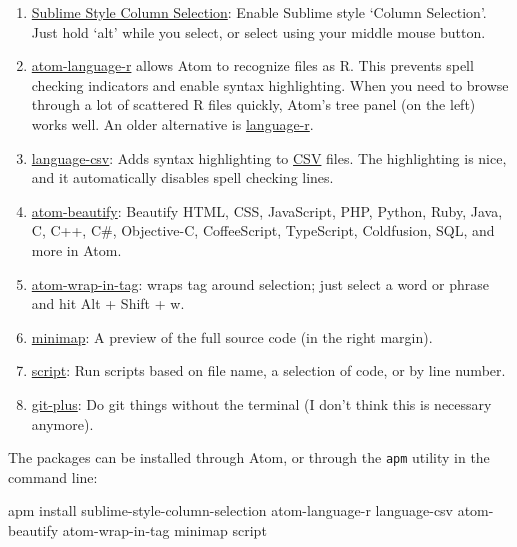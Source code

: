 \documentclass[
]{book}
\newenvironment{Shaded}{\begin{snugshade}}{\end{snugshade}}
\newcommand{\FunctionTok}[1]{\textcolor[rgb]{0.00,0.00,0.00}{#1}}
\newcommand{\NormalTok}[1]{#1}
\begin{document}
\begin{itemize}
  \begin{enumerate}
  \def\labelenumi{\arabic{enumi}.}
  \item
    \href{https://atom.io/packages/Sublime-Style-Column-Selection}{Sublime Style Column Selection}: Enable Sublime style `Column Selection'. Just hold `alt' while you select, or select using your middle mouse button.
  \item
    \href{https://atom.io/packages/atom-language-r}{atom-language-r} allows Atom to recognize files as R. This prevents spell checking indicators and enable syntax highlighting. When you need to browse through a lot of scattered R files quickly, Atom's tree panel (on the left) works well. An older alternative is \href{https://atom.io/packages/language-r}{language-r}.
  \item
    \href{https://atom.io/packages/language-csv}{language-csv}: Adds syntax highlighting to \href{https://en.wikipedia.org/wiki/Comma-separated_values}{CSV} files. The highlighting is nice, and it automatically disables spell checking lines.
  \item
    \href{https://atom.io/packages/atom-beautify}{atom-beautify}: Beautify HTML, CSS, JavaScript, PHP, Python, Ruby, Java, C, C++, C\#, Objective-C, CoffeeScript, TypeScript, Coldfusion, SQL, and more in Atom.
  \item
    \href{https://atom.io/packages/atom-wrap-in-tag}{atom-wrap-in-tag}: wraps tag around selection; just select a word or phrase and hit Alt + Shift + w.
  \item
    \href{https://atom.io/packages/minimap}{minimap}: A preview of the full source code (in the right margin).
  \item
    \href{https://atom.io/packages/script}{script}: Run scripts based on file name, a selection of code, or by line number.
  \item
    \href{https://atom.io/packages/git-plus}{git-plus}: Do git things without the terminal (I don't think this is necessary anymore).
  \end{enumerate}

  The packages can be installed through Atom, or through the \texttt{apm} utility in the command line:

\begin{Shaded}
\begin{Highlighting}[]
\FunctionTok{apm}\NormalTok{ install sublime{-}style{-}column{-}selection atom{-}language{-}r language{-}csv atom{-}beautify atom{-}wrap{-}in{-}tag minimap script}
\end{Highlighting}
\end{Shaded}


\end{itemize}
\end{document}
